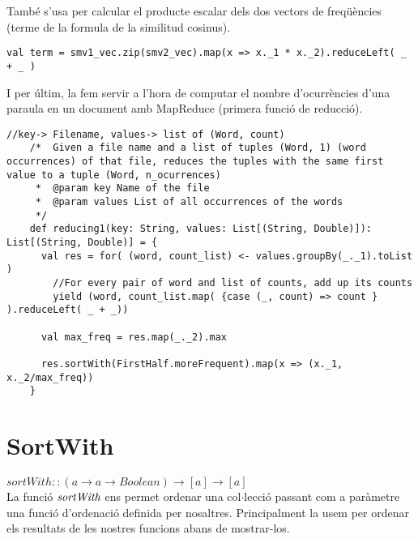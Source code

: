 \documentclass{report}
\begin{document}
També s'usa per calcular el producte escalar dels dos vectors de freqüències (terme de la formula de la similitud cosinus).

\begin{lstlisting}[style=scalaHighlight]
    val term = smv1_vec.zip(smv2_vec).map(x => x._1 * x._2).reduceLeft( _ + _ )
\end{lstlisting}

\newpage

I per últim, la fem servir a l'hora de computar el nombre d'ocurrències d'una paraula en un document amb MapReduce (primera funció de reducció).

\begin{lstlisting}[style=scalaHighlight]
//key-> Filename, values-> list of (Word, count)
    /* 	Given a file name and a list of tuples (Word, 1) (word occurrences) of that file, reduces the tuples with the same first value to a tuple (Word, n_ocurrences)
     * 	@param key Name of the file
     * 	@param values List of all occurrences of the words
     */
    def reducing1(key: String, values: List[(String, Double)]): List[(String, Double)] = {
      val res = for( (word, count_list) <- values.groupBy(_._1).toList )
        //For every pair of word and list of counts, add up its counts
        yield (word, count_list.map( {case (_, count) => count } ).reduceLeft( _ + _))

      val max_freq = res.map(_._2).max

      res.sortWith(FirstHalf.moreFrequent).map(x => (x._1, x._2/max_freq))
    }
\end{lstlisting}

\newpage

\section{SortWith}

$ sortWith :: (a \rightarrow a \rightarrow Boolean) \rightarrow [a] \rightarrow [a] $ \\

La funció $ \emph{sortWith} $ ens permet ordenar una col$\cdot$lecció passant com a paràmetre una funció d'ordenació definida per nosaltres. Principalment la usem per ordenar els resultats de les nostres funcions abans de mostrar-los.
\end{document}
